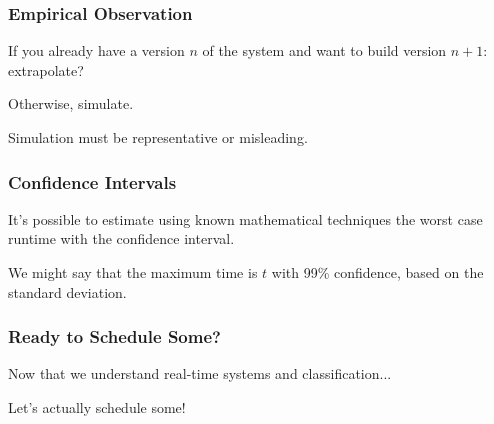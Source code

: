 \begin{frame}
\frametitle{Empirical Observation}

If you already have a version $n$ of the system and want to build version $n+1$: extrapolate?

Otherwise, simulate.

Simulation must be representative or misleading.

\end{frame}

\begin{frame}
\frametitle{Confidence Intervals}

It's possible to estimate using known mathematical techniques the worst case runtime with the \alert{confidence interval}.

We might say that the maximum time is $t$ with 99\% confidence, based on the standard deviation.

\end{frame}

\begin{frame}
\frametitle{Ready to Schedule Some?}

Now that we understand real-time systems and classification...

Let's actually schedule some!

\end{frame}




